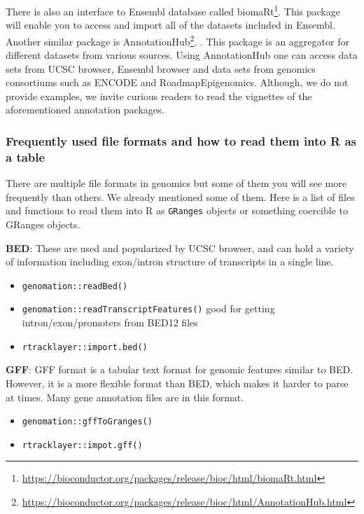 \documentclass[12pt,]{krantz}
\providecommand{\tightlist}{%
  \setlength{\itemsep}{0pt}\setlength{\parskip}{0pt}}
\renewcommand{\href}[2]{#2\footnote{\url{#1}}}
\begin{document}
There is also an interface to Ensembl database called \href{https://bioconductor.org/packages/release/bioc/html/biomaRt.html}{biomaRt}.
This package will enable you to access and import all of the datasets included
in Ensembl. Another similar package is \href{https://bioconductor.org/packages/release/bioc/html/AnnotationHub.html}{AnnotationHub}.
. This package is an aggregator for different datasets from various sources.
Using AnnotationHub one can access data sets from UCSC browser, Ensembl browser
and data sets from genomics consortiums such as ENCODE and RoadmapEpigenomics.
Although, we do not provide examples, we invite curious readers to read the
vignettes of the aforementioned annotation packages.

\hypertarget{frequently-used-file-formats-and-how-to-read-them-into-r-as-a-table}{%
\subsubsection{Frequently used file formats and how to read them into R as a table}\label{frequently-used-file-formats-and-how-to-read-them-into-r-as-a-table}}

There are multiple file formats in genomics but some of them you will see more
frequently than others. We already mentioned some of them. Here is a list of files
and functions to read them into R as \texttt{GRanges} objects or something coercible to
GRanges objects.

\textbf{BED}: These are used and popularized by UCSC browser, and can hold a variety of
information including exon/intron structure of transcripts in a single line.

\begin{itemize}
\tightlist
\item
  \texttt{genomation::readBed()}
\item
  \texttt{genomation::readTranscriptFeatures()} good for getting intron/exon/promoters from BED12 files
\item
  \texttt{rtracklayer::import.bed()}
\end{itemize}

\textbf{GFF}: GFF format is a tabular text format for genomic features similar to BED. However,
it is a more flexible format than BED, which makes it harder to parse at times. Many gene annotation files are in this format.

\begin{itemize}
\tightlist
\item
  \texttt{genomation::gffToGranges()}
\item
  \texttt{rtracklayer::impot.gff()}
\end{itemize}
\end{document}
